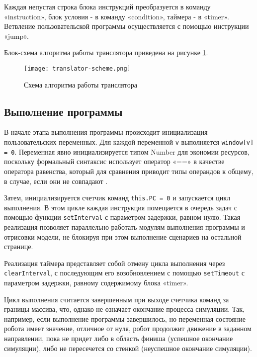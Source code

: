 Каждая непустая строка блока инструкций преобразуется в команду «instruction», блок условия - в команду «condition», таймера - в «timer». Ветвление пользовательской программы осуществляется с помощью инструкции «jump».

Блок-схема алгоритма работы транслятора приведена на рисунке \ref{fig:translator-scheme}.

\begin{figure}[htbp]
	\centering
	\texttt{[image: translator-scheme.png]}
	\caption{Схема алгоритма работы транслятора}%
	\label{fig:translator-scheme}
\end{figure}

\subsection{Выполнение программы}

В начале этапа выполнения программы происходит инициализация пользовательских переменных. Для каждой переменной \lstinline|v| выполняется \lstinline|window[v] = 0|. Переменная явно инициализируется типом Number для экономии ресурсов, поскольку формальный синтаксис использует оператор «==» в качестве оператора равенства, который для сравнения приводит типы операндов к общему, в случае, если они не совпадают \cite{mdn-sameness}.

Затем, инициализируется счетчик команд \lstinline|this.PC = 0| и запускается цикл выполнения. В этом цикле каждая инструкция помещается в очередь задач с помощью  функции \lstinline|setInterval| с параметром задержки, равном нулю. Такая реализация позволяет параллельно работать модулям выполнения программы и отрисовки модели, не блокируя при этом выполнение сценариев на остальной странице.

Реализация таймера представляет собой отмену цикла выполнения через \lstinline|clearInterval|, с последующим его возобновлением с помощью \lstinline|setTimeout| с параметром задержки, равному содержимому блока «timer».

Цикл выполнения считается завершенным при выходе счетчика команд за границы массива, что, однако не означает окончание процесса симуляции. Так, например, если выполнение программы завершилось, но переменная состояние робота имеет значение, отличное от нуля, робот продолжит движение в заданном направлении, пока не придет либо в область финиша (успешное окончание симуляции), либо не пересечется со стенкой (неуспешное окончание симуляции).

 



